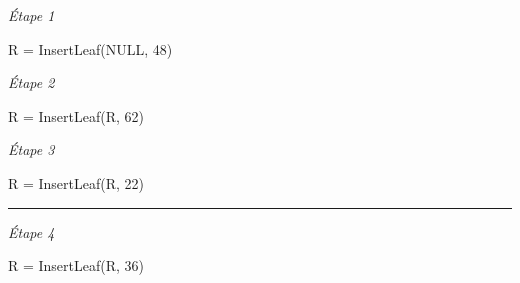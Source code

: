 \documentclass[11pt,a4paper]{article}
\begin{document}
\begin{center}



\begin{table}[ht!]
  \centering
  \begin{minipage}{0.33\textwidth}
    \centering

\textit{\'Etape 1}

R = InsertLeaf(NULL, 48)

\vspace*{3cm}

  \end{minipage}
  \hfillx
  \begin{minipage}{0.33\textwidth}
    \centering

\textit{\'Etape 2}

R = InsertLeaf(R, 62)

\vspace*{3cm}

  \end{minipage}
  \hfillx
  \begin{minipage}{0.33\textwidth}
    \centering

\textit{\'Etape 3}

R = InsertLeaf(R, 22)

\vspace*{3cm}

  \end{minipage}
\end{table}

\vspace*{-0.5cm}
\rule{1.0\linewidth}{0.75pt}



\begin{table}[ht!]
  \centering
  \begin{minipage}{0.33\textwidth}
    \centering

\textit{\'Etape 4}

R = InsertLeaf(R, 36)

\vspace*{6cm}

  \end{minipage}
  \hfillx
  \begin{minipage}{0.33\textwidth}
    \centering


\end{minipage}
\end{table}
\end{center}
\end{document}
